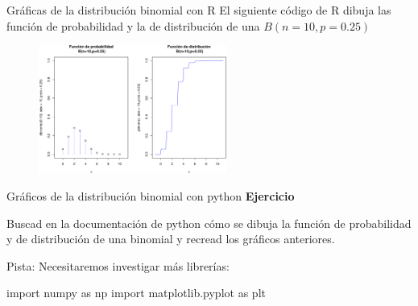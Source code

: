 \documentclass[
  ignorenonframetext,
  aspectratio=169]{beamer}
\newenvironment{Shaded}{\begin{snugshade}}{\end{snugshade}}
\newcommand{\ImportTok}[1]{\textcolor[rgb]{0.00,0.46,0.62}{#1}}
\newcommand{\NormalTok}[1]{\textcolor[rgb]{0.00,0.23,0.31}{#1}}
\begin{document}
\begin{frame}{Gráficas de la distribución binomial con R}
\protect\hypertarget{gruxe1ficas-de-la-distribuciuxf3n-binomial-con-r-1}{}
El siguiente código de R dibuja las función de probabilidad y la de
distribución de una \(B(n=10,p=0.25)\)

\begin{figure}

{\centering \includegraphics[width=0.55\textwidth,height=\textheight]{Tema_3_1_Notables_files/figure-beamer/unnamed-chunk-9-1.pdf}

}

\end{figure}
\end{frame}

\begin{frame}[fragile]{Gráficos de la distribución binomial con python}
\protect\hypertarget{gruxe1ficos-de-la-distribuciuxf3n-binomial-con-python}{}
\textbf{Ejercicio}

Buscad en la documentación de python cómo se dibuja la función de
probabilidad y de distribución de una binomial y recread los gráficos
anteriores.

Pista: Necesitaremos investigar más librerías:

\begin{Shaded}
\begin{Highlighting}[]
\ImportTok{import}\NormalTok{ numpy }\ImportTok{as}\NormalTok{ np}
\ImportTok{import}\NormalTok{ matplotlib.pyplot }\ImportTok{as}\NormalTok{ plt}
\end{Highlighting}
\end{Shaded}
\end{frame}
\end{document}
